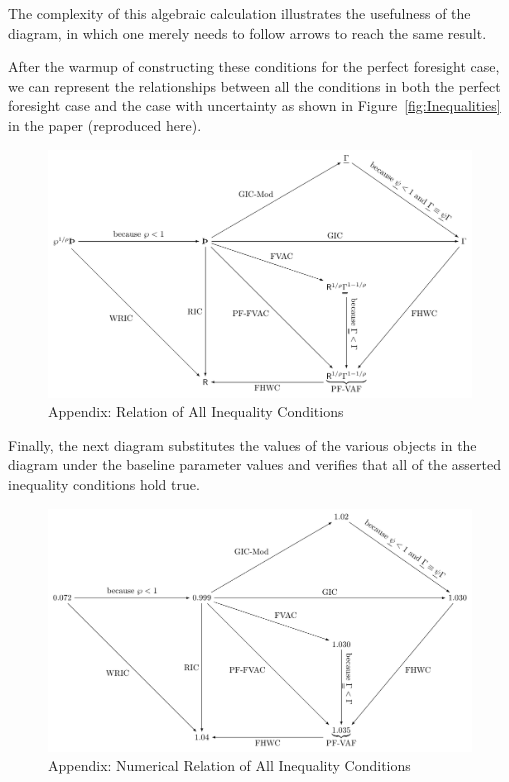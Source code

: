 \documentclass[\econtexRoot/BufferStockTheory]{subfiles}
\newcommand{\subname}{ApndxCconditionDiagrams}
\begin{document}
The complexity of this algebraic calculation illustrates the usefulness of the diagram, in which one merely needs to follow arrows to reach the same result.

After the warmup of constructing these conditions for the perfect foresight case, we can represent the relationships between all the conditions in both the perfect foresight case and the case with uncertainty as shown in Figure~\ref{fig:Inequalities} in the paper (reproduced here).

\begin{figure}[ht]
  \centerline{
    \includegraphics[width=6in]{Figures/Inequalities}
  }
  \caption{Appendix: Relation of All Inequality Conditions}\label{fig:InequalitiesApp}
\end{figure}

Finally, the next diagram substitutes the values of the various objects in the diagram under the baseline parameter values and verifies that all of the asserted inequality conditions hold true.
\begin{figure}[ht]
  \centerline{
    \includegraphics[width=6in]{Figures/Inequalities-numer}
  }
  \caption{Appendix: Numerical Relation of All Inequality Conditions}\label{fig:InequalitiesAppNumer}
\end{figure}


\end{document}
